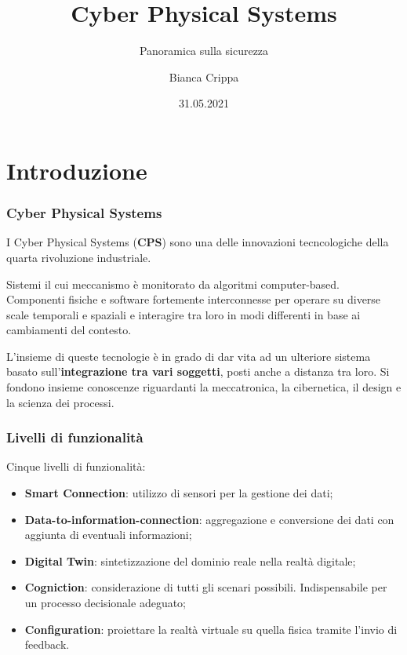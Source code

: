 \documentclass{beamer}
\title{Cyber Physical Systems}
\subtitle{Panoramica sulla sicurezza}
\author{Bianca Crippa}
\institute{Università degli Studi di Bergamo
    \\ \url{https://github.com/Biancolinaa/CPS-presentation.git}
}
\date{31.05.2021}
\begin{document}
\frame{\titlepage}


\section{Introduzione}

\begin{frame}
    \frametitle{Cyber Physical Systems}
    I Cyber Physical Systems (\textbf{CPS}) sono una delle innovazioni tecncologiche della quarta rivoluzione industriale.
    
    Sistemi il cui meccanismo è monitorato da algoritmi computer-based. 
    Componenti fisiche e software fortemente interconnesse per operare su diverse scale temporali e spaziali e  
    interagire tra loro in modi differenti in base ai cambiamenti del contesto. 

    L'insieme di queste tecnologie è in grado di dar vita ad un ulteriore sistema basato sull'\textbf{integrazione tra vari soggetti}, posti anche a 
    distanza tra loro.    
    Si fondono insieme conoscenze riguardanti la meccatronica, la cibernetica, il design e la scienza dei processi.
    
\end{frame}

\begin{frame}
\frametitle{Livelli di funzionalità}

    Cinque livelli di funzionalità:
    \begin{itemize}
        \item \textbf{Smart Connection}: utilizzo di sensori per la gestione dei dati;
        \item \textbf{Data-to-information-connection}: aggregazione e conversione dei dati con aggiunta di eventuali informazioni;
        \item \textbf{Digital Twin}: sintetizzazione del dominio reale nella realtà digitale;
        \item \textbf{Cogniction}: considerazione di tutti gli scenari possibili. Indispensabile per un processo decisionale adeguato;
        \item \textbf{Configuration}: proiettare la realtà virtuale su quella fisica tramite l'invio di feedback.
    \end{itemize}
    
\end{frame}
\end{document}
